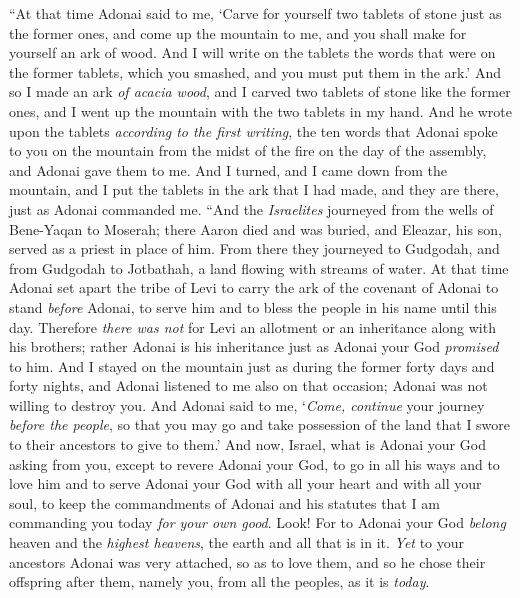 \begin{biblechapter} %
\verse “At that time Adonai said to me, ‘Carve for yourself two tablets of stone just as the former ones, and come up the mountain to me, and you shall make for yourself an ark of wood.
\verse And I will write on the tablets the words that were on the former tablets, which you smashed, and you must put them in the ark.’
\verse And so I made an ark \textit{of acacia wood}, and I carved two tablets of stone like the former ones, and I went up the mountain with the two tablets in my hand.
\verse And he wrote upon the tablets \textit{according to the first writing}, the ten words that Adonai spoke to you on the mountain from the midst of the fire on the day of the assembly, and Adonai gave them to me.
\verse And I turned, and I came down from the mountain, and I put the tablets in the ark that I had made, and they are there, just as Adonai commanded me.
\verse “And the \textit{Israelites} journeyed from the wells of Bene-Yaqan to Moserah; there Aaron died and was buried, and Eleazar, his son, served as a priest in place of him.
\verse From there they journeyed to Gudgodah, and from Gudgodah to Jotbathah, a land flowing with streams of water.
\verse At that time Adonai set apart the tribe of Levi to carry the ark of the covenant of Adonai to stand \textit{before} Adonai, to serve him and to bless the people in his name until this day.
\verse Therefore \textit{there was not} for Levi an allotment or an inheritance along with his brothers; rather Adonai is his inheritance just as Adonai your God \textit{promised} to him.
\verse And I stayed on the mountain just as during the former forty days and forty nights, and Adonai listened to me also on that occasion; Adonai was not willing to destroy you.
\verse And Adonai said to me, ‘\textit{Come, continue} your journey \textit{before the people},  so that you may go and take possession of the land that I swore to their ancestors to give to them.’
\verse And now, Israel, what is Adonai your God asking from you, except to revere Adonai your God, to go in all his ways and to love him and to serve Adonai your God with all your heart and with all your soul,
\verse to keep the commandments of Adonai and his statutes that I am commanding you today \textit{for your own good}.
\verse Look! For to Adonai your God \textit{belong} heaven and the \textit{highest heavens}, the earth and all that is in it.
\verse \textit{Yet} to your ancestors Adonai was very attached, so as to love them, and so he chose their offspring after them, namely you, from all the peoples, as it is \textit{today}.

\end{biblechapter}
